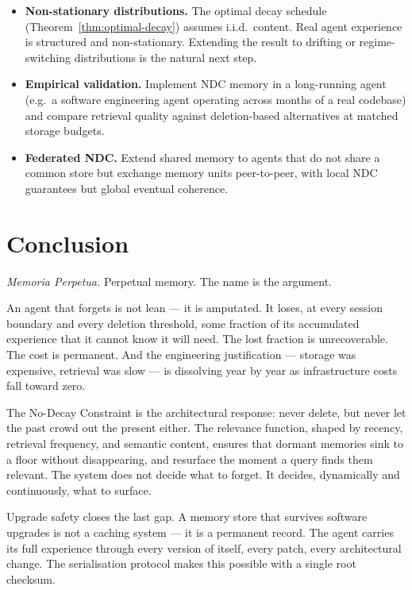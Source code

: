 \documentclass[12pt]{article}
\begin{document}
\begin{itemize}[leftmargin=*]
  \item \textbf{Non-stationary distributions.}  The optimal decay schedule
    (Theorem~\ref{thm:optimal-decay}) assumes i.i.d.\ content.  Real agent
    experience is structured and non-stationary.  Extending the result to
    drifting or regime-switching distributions is the natural next step.
  \item \textbf{Empirical validation.}  Implement NDC memory in a long-running
    agent (e.g.\ a software engineering agent operating across months of a
    real codebase) and compare retrieval quality against deletion-based
    alternatives at matched storage budgets.
  \item \textbf{Federated NDC.}  Extend shared memory to agents that do not
    share a common store but exchange memory units peer-to-peer, with local
    NDC guarantees but global eventual coherence.
\end{itemize}

\section{Conclusion}
\label{sec:conclusion}

\emph{Memoria Perpetua.}  Perpetual memory.  The name is the argument.

An agent that forgets is not lean — it is amputated.  It loses, at every
session boundary and every deletion threshold, some fraction of its
accumulated experience that it cannot know it will need.  The lost fraction
is unrecoverable.  The cost is permanent.  And the engineering justification —
storage was expensive, retrieval was slow — is dissolving year by year as
infrastructure costs fall toward zero.

The No-Decay Constraint is the architectural response: never delete, but never
let the past crowd out the present either.  The relevance function, shaped by
recency, retrieval frequency, and semantic content, ensures that dormant
memories sink to a floor without disappearing, and resurface the moment a query
finds them relevant.  The system does not decide what to forget.  It decides,
dynamically and continuously, what to surface.

Upgrade safety closes the last gap.  A memory store that survives software
upgrades is not a caching system — it is a permanent record.  The agent carries
its full experience through every version of itself, every patch, every
architectural change.  The serialisation protocol makes this possible with a
single root checksum.
\end{document}
